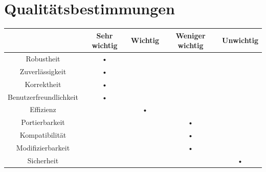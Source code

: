 \documentclass[parskip=full]{scrartcl}
\begin{document}
\newpage
\section{Qualitätsbestimmungen}
\begin{tabular}{|c|c|c|c|c|}
\hline & Sehr wichtig & Wichtig & Weniger wichtig & Unwichtig \\
\hline Robustheit & • &  &  & \\ 
\hline Zuverlässigkeit & • &  &  & \\ 
\hline Korrektheit & • &  &  & \\ 
\hline Benutzerfreundlichkeit & • &  &  & \\ 
\hline Effizienz &  & • &  & \\ 
\hline Portierbarkeit &  &  & • & \\ 
\hline Kompatibilität &  &  & • & \\ 
\hline Modifizierbarkeit &  &  & • & \\ 
\hline Sicherheit &  &  &  & • \\ 
\hline 
\end{tabular} 
\newpage
\end{document}
